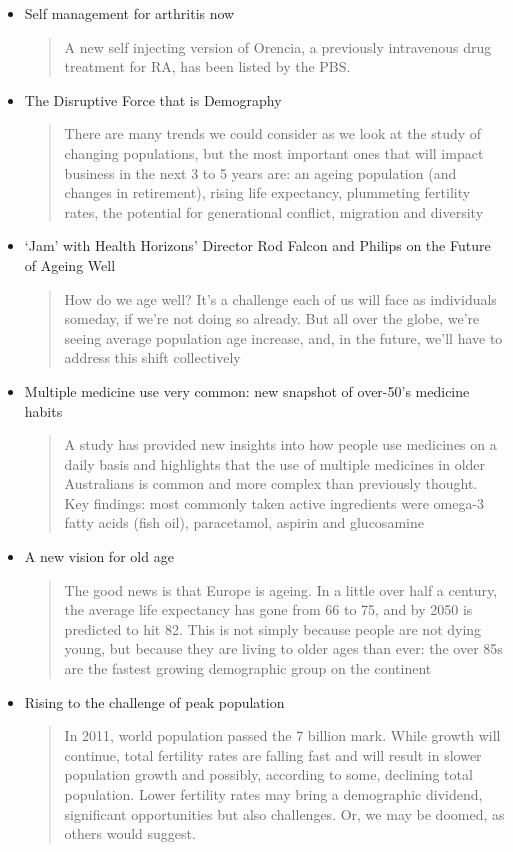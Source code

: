 \begin{itemize}
\item Self management for arthritis now
\begin{quotation}A new self injecting version of Orencia, a previously intravenous drug treatment for RA, has been listed by the PBS.\end{quotation}
\item The Disruptive Force that is Demography
\begin{quotation}There are many trends we could consider as we look at the study of changing populations, but the most important ones that will impact business in the next 3 to 5 years are: an ageing population (and changes in retirement), rising life expectancy, plummeting fertility rates, the potential for generational conflict, migration and diversity\end{quotation}
\item `Jam' with Health Horizons' Director Rod Falcon and Philips on the Future of Ageing Well
\begin{quotation}How do we age well? It's a challenge each of us will face as individuals someday, if we're not doing so already. But all over the globe, we're seeing average population age increase, and, in the future, we'll have to address this shift collectively\end{quotation}
\item Multiple medicine use very common: new snapshot of over-50's medicine habits
\begin{quotation}A study has provided new insights into how people use medicines on a daily basis and highlights that the use of multiple medicines in older Australians is common and more complex than previously thought. Key findings: most commonly taken active ingredients were omega-3 fatty acids (fish oil), paracetamol, aspirin and glucosamine\end{quotation}
\item A new vision for old age
\begin{quotation}The good news is that Europe is ageing. In a little over half a century, the average life expectancy has gone from 66 to 75, and by 2050 is predicted to hit 82. This is not simply because people are not dying young, but because they are living to older ages than ever: the over 85s are the fastest growing demographic group on the continent\end{quotation}
\item Rising to the challenge of peak population
\begin{quotation}
In 2011, world population passed the 7 billion mark. While growth will continue, total fertility rates are falling fast and will result in slower population growth and possibly, according to some, declining total population. Lower fertility rates may bring a demographic dividend, significant opportunities but also challenges. Or, we may be doomed, as others would suggest.\end{quotation}
\end{itemize}


